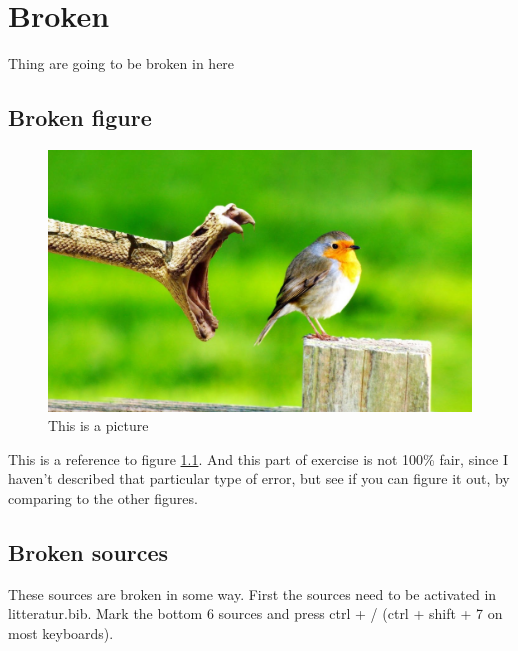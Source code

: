 \chapter{Broken}

Thing are going to be broken in here


\section{Broken figure}


\begin{figure} [H]
	\centering
	\includegraphics[width=.6\textwidth]{Pictures/Example.jpg}	
	\caption{This is a picture}
	\label{Snake}
\end{figure}

This is a reference to figure \ref{Snake}. And this part of exercise is not 100\% fair, since I haven't described that particular type of error, but see if you can figure it out, by comparing to the other figures.


\section{Broken sources}

These sources are broken in some way. First the sources need to be activated in litteratur.bib. Mark the bottom 6 sources and press ctrl + / (ctrl + shift + 7 on most keyboards). 

\citep{AAU2}

\citep{Oel}

\citep{Esri}



\citep{Seritronic1}

\citep{Seritronic2}

\citep{Seritronic3}